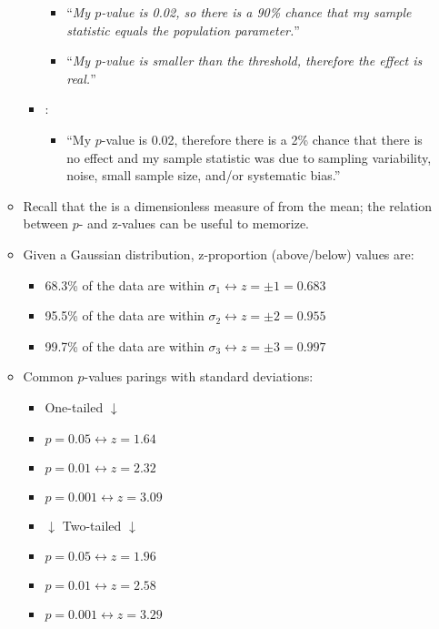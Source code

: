 \begin{itemize}
\begin{itemize}
\begin{itemize}
\begin{itemize}
            \item ``\textit{My \(p\)-value is 0.02, so there is a 90\% chance that my sample statistic equals the population parameter.}''
            \item ``\textit{My p-value is smaller than the threshold, therefore the effect is real.}''
          \end{itemize}
        \item {}: 
        \begin{itemize}
          \item ``My \(p\)-value is 0.02, therefore there is a 2\% chance that there is no effect and my sample statistic was due to sampling variability, noise, small sample size, and/or systematic bias.''
        \end{itemize}
      \end{itemize}
    \item Recall that the \hyperref[Subsection: Z-Score Standardization]{} is a dimensionless measure of \hyperref[Subsection: Measures of Dispersion]{} from the mean; the relation between \(p\)- and z-values can be useful to memorize.
    \item Given a Gaussian distribution, z-proportion (above/below) values are:
      \begin{itemize}
        \item 68.3\% of the data are within \(\sigma_1\leftrightarrow z = \pm 1=0.683\) 
        \item 95.5\% of the data are within \(\sigma_2\leftrightarrow z = \pm 2 = 0.955\)
        \item 99.7\% of the data are within \(\sigma_3\leftrightarrow z = \pm 3 = 0.997\)
      \end{itemize}
    \item Common \(p\)-values parings with standard deviations:
    \vspace{-6pt}
    \begin{multicols}{2}
      \begin{itemize}
        \item One-tailed \(\downarrow\)
        \item \(p=0.05 \leftrightarrow z = 1.64\)
        \item \(p=0.01 \leftrightarrow z = 2.32\)
        \item \(p=0.001 \leftrightarrow z = 3.09\)
        \item \(\downarrow\) Two-tailed \(\downarrow\)
        \item \(p=0.05 \leftrightarrow z = 1.96\)
        \item \(p=0.01 \leftrightarrow z = 2.58\)
        \item \(p=0.001 \leftrightarrow z = 3.29\)
      \end{itemize}
    \end{multicols}
  \end{itemize}
  

\end{itemize}
